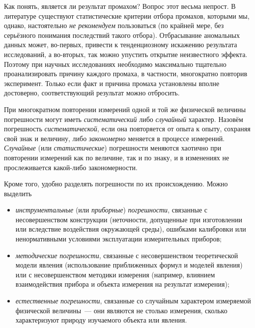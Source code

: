 
Как понять, является ли  результат промахом? Вопрос этот весьма
непрост. В литературе существуют статистические
критерии отбора промахов, которыми мы, однако, настоятельно \emph{не рекомендуем}
пользоваться (по крайней мере, без серьёзного понимания последствий
такого отбора). Отбрасывание аномальных данных может, во-первых, привести
к тенденциозному искажению результата исследований, а во-вторых, так
можно упустить открытие неизвестного эффекта. Поэтому при научных
исследованиях необходимо максимально тщательно проанализировать причину
каждого промаха, в частности, многократно повторив эксперимент. Только если факт и причина промаха установлены вполне достоверно,
соответствующий результат можно отбросить.


При многократном повторении измерений одной и той же физической величины
погрешности могут иметь \emph{систематический} либо \emph{случайный}
характер. Назовём погрешность \emph{систематической}, если она повторяется
от опыта к опыту, сохраняя свой знак и величину, либо \emph{закономерно}
меняется в процессе измерений. \emph{Случайные} (или \emph{статистические})
погрешности меняются хаотично при повторении измерений как по величине,
так и по знаку, и в изменениях не прослеживается какой-либо закономерности.

Кроме того, удобно разделять погрешности по их происхождению. Можно
выделить
\begin{itemize}\small
    \item \emph{инструментальные} (или \emph{приборные}) \emph{погрешности},
связанные с несовершенством конструкции (неточности, допущенные при
изготовлении или вследствие воздействия окружающей среды), ошибками калибровки или ненормативными условиями эксплуатации измерительных приборов;
    \item \emph{методические} \emph{погрешности}, связанные с несовершенством
теоретической модели явления (использование приближенных формул и
моделей явления) или с несовершенством методики измерения (например,
влиянием взаимодействия прибора и объекта измерения на результат измерения);
    \item \emph{естественные} \emph{погрешности}, связанные со случайным
характером измеряемой физической величины~--- они являются не столько
 измерения, сколько характеризуют
природу изучаемого объекта или явления.
\end{itemize}

